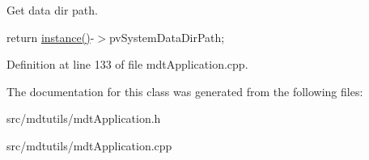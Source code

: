 Get data dir path. 



return \hyperlink{classmdt_application_a365ac79934070b0e5a42d2c7cd9b076d}{instance()}-\/$>$pvSystemDataDirPath; 



Definition at line 133 of file mdtApplication.cpp.



The documentation for this class was generated from the following files:\begin{DoxyCompactItemize}
\item 
src/mdtutils/mdtApplication.h\item 
src/mdtutils/mdtApplication.cpp\end{DoxyCompactItemize}
